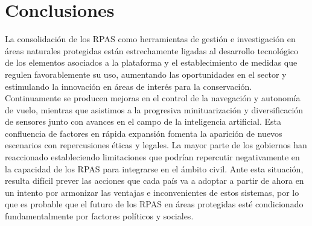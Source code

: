 \documentclass[onecolumn]{extarticle}
\begin{document}
\section{Conclusiones}\label{conclusiones}

La consolidación de los RPAS como herramientas de gestión e
investigación en áreas naturales protegidas están estrechamente ligadas
al desarrollo tecnológico de los elementos asociados a la plataforma y
el establecimiento de medidas que regulen favorablemente su uso,
aumentando las oportunidades en el sector y estimulando la innovación en
áreas de interés para la conservación. Continuamente se producen mejoras
en el control de la navegación y autonomía de vuelo, mientras que
asistimos a la progresiva minituarización y diversificación de sensores
junto con avances en el campo de la inteligencia artificial. Esta
confluencia de factores en rápida expansión fomenta la aparición de
nuevos escenarios con repercusiones éticas y legales. La mayor parte de
los gobiernos han reaccionado estableciendo limitaciones que podrían
repercutir negativamente en la capacidad de los RPAS para integrarse en
el ámbito civil. Ante esta situación, resulta difícil prever las
acciones que cada país va a adoptar a partir de ahora en un intento por
armonizar las ventajas e inconvenientes de estos sistemas, por lo que es
probable que el futuro de los RPAS en áreas protegidas esté condicionado
fundamentalmente por factores políticos y sociales.

\newpage
\singlespacing 

\end{document}
